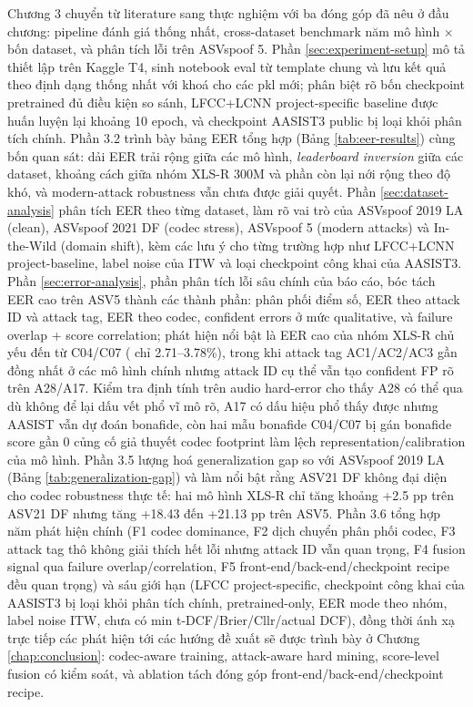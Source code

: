 Chương 3 chuyển từ literature sang thực nghiệm với ba đóng góp đã nêu ở đầu chương: pipeline đánh giá thống nhất, cross-dataset benchmark năm mô hình $\times$ bốn dataset, và phân tích lỗi trên ASVspoof 5. Phần \ref{sec:experiment-setup} mô tả thiết lập trên Kaggle T4, sinh notebook eval từ template chung và lưu kết quả theo định dạng  thống nhất với khoá  cho các pkl mới; phân biệt rõ bốn checkpoint pretrained đủ điều kiện so sánh, LFCC+LCNN project-specific baseline được huấn luyện lại khoảng 10 epoch, và checkpoint AASIST3 public bị loại khỏi phân tích chính. Phần 3.2 trình bày bảng EER tổng hợp (Bảng \ref{tab:eer-results}) cùng bốn quan sát: dải EER trải rộng giữa các mô hình, \textit{leaderboard inversion} giữa các dataset, khoảng cách giữa nhóm XLS-R 300M và phần còn lại nới rộng theo độ khó, và modern-attack robustness vẫn chưa được giải quyết. Phần \ref{sec:dataset-analysis} phân tích EER theo từng dataset, làm rõ vai trò của ASVspoof 2019 LA (clean), ASVspoof 2021 DF (codec stress), ASVspoof 5 (modern attacks) và In-the-Wild (domain shift), kèm các lưu ý cho từng trường hợp như LFCC+LCNN project-baseline, label noise của ITW và loại checkpoint công khai của AASIST3. Phần \ref{sec:error-analysis}, phần phân tích lỗi sâu chính của báo cáo, bóc tách EER cao trên ASV5 thành các thành phần: phân phối điểm số, EER theo attack ID và attack tag, EER theo codec, confident errors ở mức qualitative, và failure overlap + score correlation; phát hiện nổi bật là EER cao của nhóm XLS-R chủ yếu đến từ C04/C07 ( chỉ 2.71--3.78\%), trong khi attack tag AC1/AC2/AC3 gần đồng nhất ở các mô hình chính nhưng attack ID cụ thể vẫn tạo confident FP rõ trên A28/A17. Kiểm tra định tính trên audio hard-error cho thấy A28  có thể qua  dù không để lại dấu vết phổ vĩ mô rõ, A17  có dấu hiệu phổ thấy được nhưng AASIST vẫn dự đoán bonafide, còn hai mẫu bonafide C04/C07 bị  gán bonafide score gần 0 củng cố giả thuyết codec footprint làm lệch representation/calibration của mô hình. Phần 3.5 lượng hoá generalization gap so với ASVspoof 2019 LA (Bảng \ref{tab:generalization-gap}) và làm nổi bật rằng ASV21 DF không đại diện cho codec robustness thực tế: hai mô hình XLS-R chỉ tăng khoảng +2.5 pp trên ASV21 DF nhưng tăng +18.43 đến +21.13 pp trên ASV5. Phần 3.6 tổng hợp năm phát hiện chính (F1 codec dominance, F2 dịch chuyển phân phối codec, F3 attack tag thô không giải thích hết lỗi nhưng attack ID vẫn quan trọng, F4 fusion signal qua failure overlap/correlation, F5 front-end/back-end/checkpoint recipe đều quan trọng) và sáu giới hạn (LFCC project-specific, checkpoint công khai của AASIST3 bị loại khỏi phân tích chính, pretrained-only, EER mode theo nhóm, label noise ITW, chưa có min t-DCF/Brier/Cllr/actual DCF), đồng thời ánh xạ trực tiếp các phát hiện tới các hướng đề xuất sẽ được trình bày ở Chương \ref{chap:conclusion}: codec-aware training, attack-aware hard mining, score-level fusion có kiểm soát, và ablation tách đóng góp front-end/back-end/checkpoint recipe.

